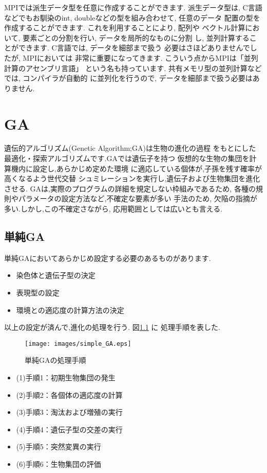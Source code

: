 \documentclass[a4paper,titlepage]{jreport}
\begin{document}
MPIでは派生データ型を任意に作成することができます. 派生データ型は, 
C言語などでもお馴染のint, doubleなどの型を組み合わせて, 任意のデータ
配置の型を作成することができます. これを利用することにより, 配列や
ベクトル計算において, 要素ごとの分割を行い, データを局所的なものに分割
し, 並列計算することができます. C言語では, データを細部まで扱う
必要はさほどありませんでしたが, MPIにおいては
非常に重要になってきます. こういう点からMPIは「並列計算のアセンブリ言語」
という名も持っています. 共有メモリ型の並列計算などでは, コンパイラが自動的
に並列化を行うので, データを細部まで扱う必要はありません.

\chapter{GA}
遺伝的アルゴリズム(Genetic Algorithm;GA)は生物の進化の過程
をもとにした最適化・探索アルゴリズムです.GAでは遺伝子を持つ
仮想的な生物の集団を計算機内に設定し,あらかじめ定めた環境
に適応している個体が,子孫を残す確率が高くなるよう世代交替
シュミレーションを実行し,遺伝子および生物集団を進化させる.
GAは,実際のプログラムの詳細を規定しない枠組みであるため,
各種の規則やパラメータの設定方法など,不確定な要素が多い
手法のため, 欠陥の指摘が多い.しかし,この不確定さながら,
応用範囲としては広いとも言える.

\section{単純GA}
単純GAにおいてあらかじめ設定する必要のあるものがあります.

\begin{itemize}
\item 染色体と遺伝子型の決定
\item 表現型の設定
\item 環境との適応度の計算方法の決定
\end{itemize}

以上の設定が済んで,進化の処理を行う. 図\ref{SIMPLE_GA} に
処理手順を表した.

\begin{figure}[tb]
\begin{center}
{
   \scalebox{0.3}
   {
      \texttt{[image: images/simple\_GA.eps]}
   }
}
\caption{単純GAの処理手順 \label{SIMPLE_GA}}
\end{center}
\end{figure}

\begin{itemize}
\item[] (1)手順1：初期生物集団の発生
\item[] (2)手順2：各個体の適応度の計算
\item[] (3)手順3：淘汰および増殖の実行
\item[] (4)手順4：遺伝子型の交差の実行
\item[] (5)手順5：突然変異の実行
\item[] (6)手順6：生物集団の評価
\end{itemize}
\end{document}
